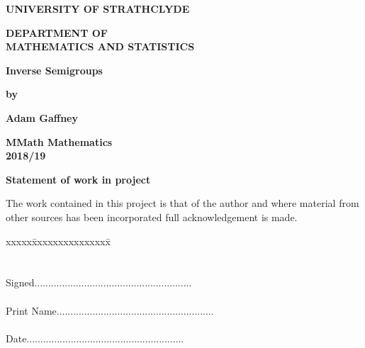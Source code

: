 \documentclass[12pt]{article}
\begin{document}
\thispagestyle{empty}
\Large
\vspace*{2cm}
\begin{center}
\textbf{UNIVERSITY OF STRATHCLYDE}
\end{center}

\vspace*{1cm}
\begin{center}
\textbf{DEPARTMENT OF\\ MATHEMATICS AND STATISTICS}
\end{center}

\vspace*{1cm}
\begin{center}
\textbf{Inverse Semigroups}
\end{center}

\vspace*{1cm}
\begin{center}
\textbf{by}
\end{center}

\vspace*{1cm}
\begin{center}
\textbf{Adam Gaffney}\\
\end{center}

\vspace*{3cm}
\begin{center}
\textbf{MMath Mathematics}\\
\textbf{2018/19}
\end{center}

\newpage
\Large

\vspace*{1cm}
\begin{center}
\textbf{Statement of work in project}
\end{center}

\vspace*{1cm}
\begin{center}
\parbox{14cm}{
The work contained in this project is that of the author and where
material from other sources has been incorporated full acknowledgement
is made.}
\end{center}

\begin{center}
\begin{tabbing}
xxxxx\=xxxxxxxxxxxxxxx\= \kill
\\
\\
\\
\>Signed\>.........................................................\\
\\
\>Print Name\>.........................................................\\
\\
\>Date\>.........................................................\\
\end{tabbing}
\end{center}
\end{document}
